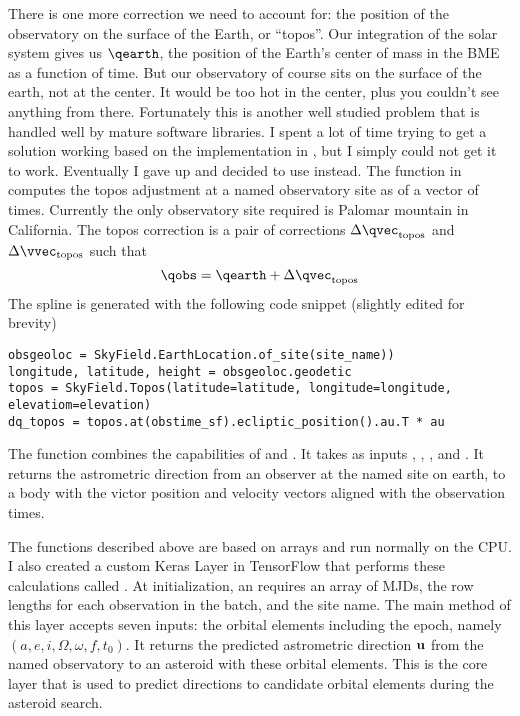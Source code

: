 There is one more correction we need to account for: the position of the observatory on the surface of the Earth, or ``topos''.
Our integration of the solar system gives us $\qearth$, the position of the Earth's center of mass in the BME as a function of time.
But our observatory of course sits on the surface of the earth, not at the center.
It would be too hot in the center, plus you couldn't see anything from there.
Fortunately this is another well studied problem that is handled well by mature software libraries.
I spent a lot of time trying to get a solution working based on the implementation in ,  but I simply could not get it to work.
Eventually I gave up and decided to use  instead.
The function  in  computes the topos adjustment at a named observatory site as of a vector of times.
Currently the only observatory site required is Palomar mountain in California.
The topos correction is a pair of corrections $\Delta \qvec_{\mathrm{topos}}$ and $\Delta \vvec_{\mathrm{topos}}$ such that
$$\qobs = \qearth + \Delta \qvec_{\mathrm{topos}}$$
The spline is generated with the following code snippet (slightly edited for brevity)
\begin{lstlisting}[style=CodeSnippet]
obsgeoloc = SkyField.EarthLocation.of_site(site_name))
longitude, latitude, height = obsgeoloc.geodetic
topos = SkyField.Topos(latitude=latitude, longitude=longitude, elevatiom=elevation)
dq_topos = topos.at(obstime_sf).ecliptic_position().au.T * au
\end{lstlisting}

The function  combines the capabilities of  and .
It takes as inputs , , ,  and .
It returns the astrometric direction from an observer at the named site on earth, 
to a body with the victor position and velocity vectors aligned with the observation times.

The functions described above are based on  arrays and run normally on the CPU.
I also created a custom Keras Layer in TensorFlow that performs these calculations called .
At initialization, an  requires an array  of MJDs, the row lengths for each observation in the batch, and the site name.
The main  method of this layer accepts seven inputs: the orbital elements including the epoch, namely
$(a, e, i, \Omega, \omega, f, t_0)$.
It returns the predicted astrometric direction $\mathbf{u}$ from the named observatory to an asteroid with these orbital elements.
This is the core layer that is used to predict directions to candidate orbital elements during the asteroid search.

